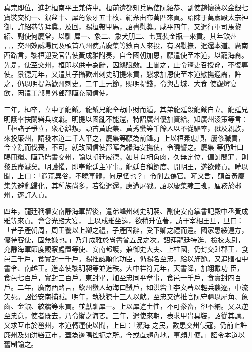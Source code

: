 \begin{pinyinscope}
 真宗即位，進封桓南平王兼侍中。桓前遺都知兵馬使阮紹恭、副使趙懷德以金銀七寶裝交椅一、銀盆十、犀角象牙五十枚、絹糸由布萬匹來貢。詔陳于萬歲殿太宗神御，許紹恭等拜奠。及回，賜桓帶甲馬，詔書慰獎。咸平四年，又遣行軍司馬黎紹、副使何慶常，以馴
 犀一、象二、象犬朋二、七寶裝金瓶一來貢。其年欽州言，交州效誠場民及頭首八州使黃慶集等數百人來投，有詔慰撫，遣還本道。廣南西路言，黎桓迎受官告使黃成雅附奏，自今國朝加恩，願遣使至本道，以寵海裔。先是，使至交州，桓即以供奉為辭，因緣賦斂。上聞之，止令疆吏召授命，不復專使。景德元年，又遣其子攝歡州刺史明提來貢，懇求加恩使至本道慰撫遐裔，許之，仍以明提為歡州刺史。二年上元節，賜明提錢，令與占城、大食
 使觀燈宴飲，因遣工部員外郎邵曄充國信使。



 三年，桓卒，立中子龍鉞。龍鉞兄龍全劫庫財而遁，其弟龍廷殺龍鉞自立。龍廷兄明護率扶闌砦兵攻戰。明提以國亂不能還，特詔廣州優加資給。知廣州淩策等言：「桓諸子爭立，衆心離叛，頭首黃慶集、黃秀蠻等千餘人以不從驅率，戮及親族，來投廉州，請發本道二千人平之，慶集等願為前鋒。」上以桓素忠順，屢修職貢，今幸亂而伐喪，不可。就改國信使邵曄為緣海安撫使，令曉譬之。慶集
 等仍計口賜田糧。曄乃貽書交州，諭以朝廷威德，如其自相魚肉，久無定位，偏師問罪，則黎氏盡滅矣。明護懼，即奉龍廷主軍事。龍廷自稱節度、開明王，遂欲修貢。曄以聞，上曰：「遐荒異俗，不曉事體，何足怪也？」令削去偽官。曄又言，頭首黃慶集先避亂歸化，其種族尚多，若復遣還，慮遭屠戮。詔以慶集隸三班，厘務於郴州，遂許入貢。



 四年，龍廷稱權安南靜海軍留後，遣弟峰州刺史明昶、副使安南掌書記殿中丞黃成雅等來貢。會含光殿大宴，
 上以成雅坐遠，欲稍升位著，訪于宰相王旦，旦曰：「昔子產朝周，周王饗以上卿之禮，子產固辭，受下卿之禮而還。國家惠綏遠方，優待客使，固無嫌也。」乃升成雅於尚書省五品之次。詔拜龍廷特進、檢校太尉，充靜海軍節度觀察處置等使、安南都護，兼御史大夫、上柱國，仍封交趾郡王，食邑三千戶，食實封一千戶。賜推誠順化功臣，仍賜名至忠，給以旌節。又追贈桓中書令、南越王。進奉使黎明昶等並進秩。大中祥符元年，天書降，加翊戴功
 臣，食邑七百戶，實封三百戶。東封畢，加至忠同平章事，食邑一千戶，食實封四百戶。二年，廣南西路言，欽州蠻人劫海口蜑戶，如洪砦主李文著以輕兵襲逐，中流矢死。詔督安南捕賊。明年，執狄獠十三人以獻。至忠又遣推官阮守疆以犀角、象齒、金銀、紋縭等來貢。並獻馴犀一。上以犀違土性，不可豢畜，卻不納。又以逆至忠意，使者既去，乃令縱之海ㄛ。三年，遣使來朝，表求甲胄具裝，詔從其請。又求互市於邕州，本道轉運使以聞，上曰：「瀕海
 之民，數患交州侵寇，仍前止許廉州及如洪砦互市，蓋為邊隅控扼之所。今或直趨內地，事頗非便。」詔令本道以舊制諭之。




\end{pinyinscope}
